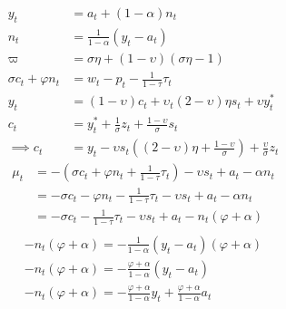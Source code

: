 
\begin{align}
    y_t &= a_t + (1-\alpha)n_t\\
    n_t &= \frac{1}{1-\alpha}(y_t - a_t)\\
    \varpi &= \sigma \eta + (1-\upsilon)(\sigma \eta - 1)\\
    \sigma c_t + \varphi n_t &= w_t - p_t - \frac{1}{1-\tau}\tau_t\\
    y_t &= (1-\upsilon)c_t + \upsilon_t(2-\upsilon)\eta s_t + \upsilon y_t^*\\
    c_t &= y_t^* + \frac{1}{\sigma}z_t + \frac{1-\upsilon}{\sigma}s_t\\
    \implies c_t &= y_t - \upsilon s_t \left( (2-\upsilon)\eta + \frac{1-\upsilon}{\sigma}\right) + \frac{\upsilon}{\sigma}z_t
\end{align}
\begin{align}
    \mu_t &= -(\sigma c_t + \varphi n_t + \frac{1}{1-\tau}\tau_t) - \upsilon s_t + a_t - \alpha n_t\\
    &= -\sigma c_t - \varphi n_t - \frac{1}{1-\tau}\tau_t - \upsilon s_t + a_t - \alpha n_t\\
    &= -\sigma c_t - \frac{1}{1-\tau}\tau_t - \upsilon s_t + a_t - n_t(\varphi + \alpha)\\
\end{align}
\begin{align}
    -n_t(\varphi + \alpha) = -\frac{1}{1-\alpha}(y_t - a_t)(\varphi + \alpha)\\
    -n_t(\varphi + \alpha) = -\frac{\varphi + \alpha}{1-\alpha}(y_t - a_t)\\
    -n_t(\varphi + \alpha) = -\frac{\varphi + \alpha}{1-\alpha}y_t + \frac{\varphi + \alpha}{1-\alpha}a_t\\
\end{align}
